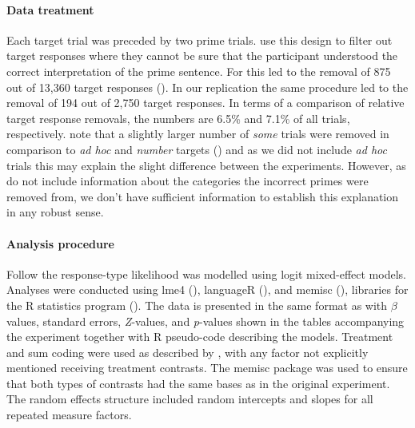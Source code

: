 \documentclass[10pt]{article}
\begin{document}
\begin{multicols}{2}

\paragraph{Data treatment}

Each target trial was preceded by two prime trials.
\citeauthor{Bott:2016aa} use this design to filter out target responses where they cannot be sure that the participant understood the correct interpretation of the prime sentence.
For \citeauthor{Bott:2016aa} this led to the removal of 875 out of 13,360 target responses (\citeyear[124]{Bott:2016aa}).
In our replication the same procedure led to the removal of 194 out of 2,750 target responses.
In terms of a comparison of relative target response removals, the numbers are 6.5\% and 7.1\% of all trials, respectively.
\citeauthor{Bott:2016aa} note that a slightly larger number of \emph{some} trials were removed in comparison to \emph{ad hoc} and \emph{number} targets (\citeyear[124]{Bott:2016aa}) and as we did not include \emph{ad hoc} trials this may explain the slight difference between the experiments.
However, as \citeauthor{Bott:2016aa} do not include information about the categories the incorrect primes were removed from, we don't have sufficient information to establish this explanation in any robust sense.

\paragraph{Analysis procedure}

Follow \citeauthor{Bott:2016aa} the response-type likelihood was modelled using logit mixed-effect models.
Analyses were conducted using lme4 (\cite{Bates:2014aa}), languageR (\cite{Baayen:2011aa}), and memisc (\cite{Elff:2012aa}), libraries for the R statistics program (\cite{Team:2013aa}).
The data is presented in the same format as \citeauthor{Bott:2016aa} with \(\beta\) values, standard errors, \emph{Z}-values, and \emph{p}-values shown in the tables accompanying the experiment together with R pseudo-code describing the models.
Treatment and sum coding were used as described by \citeauthor{Bott:2016aa}, with any factor not explicitly mentioned receiving treatment contrasts.
The memisc package was used to ensure that both types of contrasts had the same bases as in the original experiment.
The random effects structure included random intercepts and slopes for all repeated measure factors.


\end{multicols}
\end{document}
